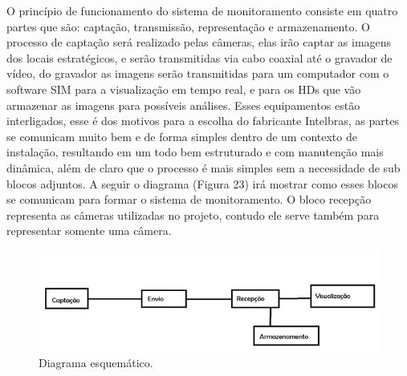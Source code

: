 	O princípio de funcionamento do sistema de monitoramento consiste em quatro partes que são: captação, transmissão, representação e armazenamento. O processo de captação será realizado pelas câmeras, elas irão captar as imagens dos locais estratégicos, e serão transmitidas via cabo coaxial até o gravador de vídeo, do gravador as imagens serão transmitidas para um computador com o software SIM para a visualização em tempo real, e para os HDs que vão armazenar as imagens para possíveis análises. Esses equipamentos estão interligados, esse é dos motivos para a escolha do fabricante Intelbras, as partes se comunicam muito bem e de forma simples dentro de um contexto de instalação, resultando em um todo bem estruturado e com manutenção mais dinâmica, além de claro que o processo é mais simples sem a necessidade de sub blocos adjuntos. A seguir o diagrama (Figura 23) irá mostrar como esses blocos se comunicam para formar o sistema de monitoramento. O bloco recepção representa as câmeras utilizadas no projeto, contudo ele serve também para representar somente uma câmera. 


	\begin{figure}[H]
	 \centering
	\label{Diagrama esquemático}
	 \includegraphics[keepaspectratio=true,scale=0.8]{monitoramento/25.png}
	 \caption{Diagrama esquemático.}
	\end{figure}

